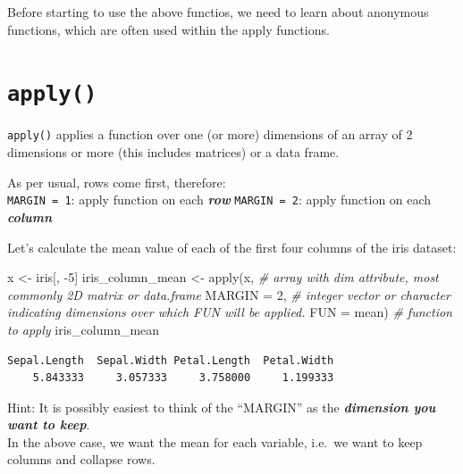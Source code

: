 \documentclass[
]{book}
\makeatletter
\newenvironment{Shaded}{\begin{snugshade}}{\end{snugshade}}
\newcommand{\AttributeTok}[1]{\textcolor[rgb]{0.77,0.63,0.00}{#1}}
\newcommand{\CommentTok}[1]{\textcolor[rgb]{0.56,0.35,0.01}{\textit{#1}}}
\newcommand{\DecValTok}[1]{\textcolor[rgb]{0.00,0.00,0.81}{#1}}
\newcommand{\FunctionTok}[1]{\textcolor[rgb]{0.00,0.00,0.00}{#1}}
\newcommand{\NormalTok}[1]{#1}
\newcommand{\OtherTok}[1]{\textcolor[rgb]{0.56,0.35,0.01}{#1}}
\newcommand{\SpecialCharTok}[1]{\textcolor[rgb]{0.00,0.00,0.00}{#1}}
\newenvironment{kframe}{%
\medskip{}
\setlength{\fboxsep}{.8em}
 \def\at@end@of@kframe{}%
 \ifinner\ifhmode%
  \def\at@end@of@kframe{\end{minipage}}%
  \begin{minipage}{\columnwidth}%
 \fi\fi%
 \def\FrameCommand##1{\hskip\@totalleftmargin \hskip-\fboxsep
 \colorbox{shadecolor}{##1}\hskip-\fboxsep
     \hskip-\linewidth \hskip-\@totalleftmargin \hskip\columnwidth}%
 \MakeFramed {\advance\hsize-\width
   \@totalleftmargin\z@ \linewidth\hsize
   \@setminipage}}%
 {\par\unskip\endMakeFramed%
 \at@end@of@kframe}
\newenvironment{rmdblock}[1]
  {
  \begin{itemize}
  \renewcommand{\labelitemi}{
    \raisebox{-.7\height}[0pt][0pt]{
      {\setkeys{Gin}{width=3em,keepaspectratio}\texttt{[image: images/\#1]}}
    }
  }
  \setlength{\fboxsep}{1em}
  \begin{kframe}
  \item
  }
  {
  \end{kframe}
  \end{itemize}
  }
\newenvironment{note}
  {\begin{rmdblock}{note}}
  {\end{rmdblock}}
\newenvironment{info}
  {\begin{rmdblock}{info}}
  {\end{rmdblock}}
\makeatother
\begin{document}
Before starting to use the above functios, we need to learn about anonymous functions, which are often used within the apply functions.

\hypertarget{apply}{%
\section{\texorpdfstring{\texttt{apply()}}{apply()}}\label{apply}}

\begin{info}
\texttt{apply()} applies a function over one (or more) dimensions of an
array of 2 dimensions or more (this includes matrices) or a data frame.

As per usual, rows come first, therefore:\\
\texttt{MARGIN\ =\ 1}: apply function on each \textbf{\emph{row}}
\texttt{MARGIN\ =\ 2}: apply function on each \textbf{\emph{column}}
\end{info}

Let's calculate the mean value of each of the first four columns of the iris dataset:

\begin{Shaded}
\begin{Highlighting}[]
\NormalTok{x }\OtherTok{\textless{}{-}}\NormalTok{ iris[, }\SpecialCharTok{{-}}\DecValTok{5}\NormalTok{]}
\NormalTok{iris\_column\_mean }\OtherTok{\textless{}{-}} 
  \FunctionTok{apply}\NormalTok{(x,          }\CommentTok{\# array with \textquotesingle{}dim\textquotesingle{} attribute, most commonly 2D matrix or data.frame}
        \AttributeTok{MARGIN =} \DecValTok{2}\NormalTok{, }\CommentTok{\# integer vector or character indicating dimensions over which \textquotesingle{}FUN\textquotesingle{} will be applied.}
        \AttributeTok{FUN =}\NormalTok{ mean) }\CommentTok{\# function to apply}
\NormalTok{iris\_column\_mean}
\end{Highlighting}
\end{Shaded}

\begin{verbatim}
Sepal.Length  Sepal.Width Petal.Length  Petal.Width 
    5.843333     3.057333     3.758000     1.199333 
\end{verbatim}

\begin{note}
Hint: It is possibly easiest to think of the ``MARGIN'' as the
\textbf{\emph{dimension you want to keep}}.\\
In the above case, we want the mean for each variable, i.e.~we want to
keep columns and collapse rows.
\end{note}
\end{document}
